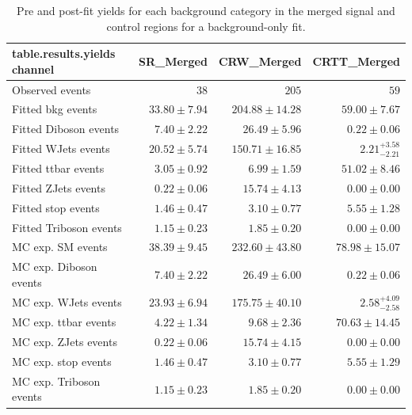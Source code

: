 \begin{table}[t]
\centering
\small
\begin{tabular*}{\textwidth}{@{\extracolsep{\fill}}lrrr}
\toprule
\textbf{table.results.yields channel}           & SR\_Merged            & CRW\_Merged            & CRTT\_Merged              \\
\midrule
Observed events          & $38$              & $205$              & $59$                    \\
\midrule
Fitted bkg events         & $33.80 \pm 7.94$          & $204.88 \pm 14.28$          & $59.00 \pm 7.67$              \\
\midrule
        Fitted Diboson events         & $7.40 \pm 2.22$          & $26.49 \pm 5.96$          & $0.22 \pm 0.06$              \\
        Fitted WJets events         & $20.52 \pm 5.74$          & $150.71 \pm 16.85$          & $2.21_{-2.21}^{+3.58}$              \\
        Fitted ttbar events         & $3.05 \pm 0.92$          & $6.99 \pm 1.59$          & $51.02 \pm 8.46$              \\
        Fitted ZJets events         & $0.22 \pm 0.06$          & $15.74 \pm 4.13$          & $0.00 \pm 0.00$              \\
        Fitted stop events         & $1.46 \pm 0.47$          & $3.10 \pm 0.77$          & $5.55 \pm 1.28$              \\
        Fitted Triboson events         & $1.15 \pm 0.23$          & $1.85 \pm 0.20$          & $0.00 \pm 0.00$              \\
 \midrule
MC exp. SM events              & $38.39 \pm 9.45$          & $232.60 \pm 43.80$          & $78.98 \pm 15.07$              \\
\midrule
        MC exp. Diboson events         & $7.40 \pm 2.22$          & $26.49 \pm 6.00$          & $0.22 \pm 0.06$              \\
        MC exp. WJets events         & $23.93 \pm 6.94$          & $175.75 \pm 40.10$          & $2.58_{-2.58}^{+4.09}$              \\
        MC exp. ttbar events         & $4.22 \pm 1.34$          & $9.68 \pm 2.36$          & $70.63 \pm 14.45$              \\
        MC exp. ZJets events         & $0.22 \pm 0.06$          & $15.74 \pm 4.15$          & $0.00 \pm 0.00$              \\
        MC exp. stop events         & $1.46 \pm 0.47$          & $3.10 \pm 0.77$          & $5.55 \pm 1.29$              \\
        MC exp. Triboson events         & $1.15 \pm 0.23$          & $1.85 \pm 0.20$          & $0.00 \pm 0.00$              \\
\bottomrule
\end{tabular*}
\caption{Pre and post-fit yields for each background category in the merged signal and control regions for a background-only fit.}
\label{tab:yields_mgd}
\end{table}

